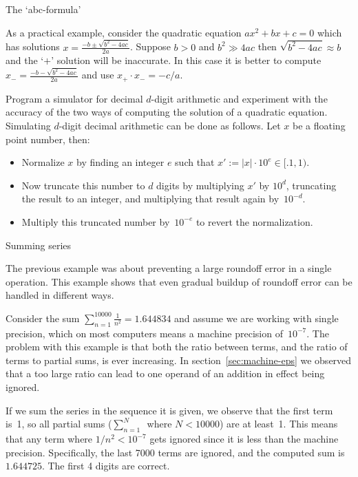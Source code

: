  {The `abc-formula'}

As a practical example, consider the quadratic equation $ax^2+bx+c=0$ 
which has solutions $x=\frac{-b\pm\sqrt{b^2-4ac}}{2a}$.
Suppose $b>0$ and $b^2\gg 4ac$ then $\sqrt{b^2-4ac}\approx b$ and
the `$+$' solution will be
inaccurate. In this case it is better 
to compute $x_-=\frac{-b-\sqrt{b^2-4ac}}{2a}$ and use $x_+\cdot x_-=-c/a$.

\begin{exercise}
  Program a simulator for decimal $d$-digit arithmetic and experiment with the
  accuracy of the two ways of computing the solution of a quadratic
  equation. Simulating $d$-digit decimal arithmetic can be done as
  follows. Let $x$ be a floating point number, then:
  \begin{itemize}
  \item Normalize $x$ by finding an integer $e$ such that
    $x'\mathrel{:=} |x|\cdot 10^e\in[.1,1)$. 
    \item Now truncate this number to $d$ digits by 
      multiplying $x'$ by $10^d$, truncating the result to an integer,
      and multiplying that result again by~$10^{-d}$.
    \item Multiply this truncated number by~$10^{-e}$ to revert the
      normalization.
  \end{itemize}
\end{exercise}

 {Summing series}

The previous example was about preventing a large roundoff error in a
single operation. This example shows that even gradual buildup of
roundoff error can be handled in different ways.

Consider the sum $\sum_{n=1}^{10000}\frac{1}{n^2}=1.644834$
and assume we are working with single precision, which on most computers
means a machine precision of~$10^{-7}$. The problem with this example
is that both the ratio between terms, and the ratio of terms to
partial sums, is ever increasing. In section~\ref{sec:machine-eps} we
observed that a too large ratio can lead to one operand of an addition in
effect being ignored.

If we sum the series in the sequence it is given, we observe that
the first term is~1, so all partial sums ($\sum_{n=1}^N$~where $N<10000$)
are at least~1. This means that any term where $1/n^2<10^{-7}$ gets
ignored since it is less than the machine precision.
Specifically, the last 7000 terms are ignored, and
the computed sum is~$1.644725$. The first 4 digits are correct.

